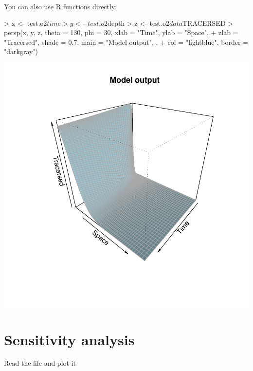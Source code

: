 \documentclass{scrartcl}
\begin{document}
You can also use R functions directly:
\begin{Schunk}
\begin{Sinput}
> x <- test.o2$time
> y <- test.o2$depth
> z <- test.o2$data$TRACERSED
> persp(x, y, z, theta = 130, phi = 30, xlab = "Time", ylab = "Space", 
+     zlab = "Tracersed", shade = 0.7, main = "Model output", , 
+     col = "lightblue", border = "darkgray")
\end{Sinput}
\end{Schunk}
\includegraphics{figures/f-1dother}

\section{Sensitivity analysis}

Read the file and plot it  
\end{document}

